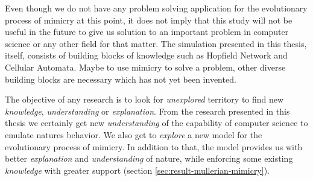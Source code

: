 \documentclass[letterpaper]{article}
\numberwithin{equation}{section}
\begin{document}
Even though we do not have any problem solving application for the evolutionary process of mimicry at this point, it does not imply that this study will not be useful in the future to give us solution to an important problem in computer science or any other field for that matter. The simulation presented in this thesis, itself, consists of building blocks of knowledge such as Hopfield Network and Cellular Automata. Maybe to use mimicry to solve a problem, other diverse building blocks are necessary which has not yet been invented.

The objective of any research is to look for \textsl{unexplored} territory to find new \textsl{knowledge}, \textsl{understanding} or \textsl{explanation}. From the research presented in this thesis we certainly get new \textsl{understanding} of the capability of computer science to emulate natures behavior. We also get to \textsl{explore} a new model for the evolutionary process of  mimicry. In addition to that, the model provides us with better \textsl{explanation} and \textsl{understanding} of nature, while enforcing some existing \textsl{knowledge} with greater support (section \ref{sec:result-mullerian-mimicry}). 




\printglossaries
{} \label{acronyms}
\end{document}
